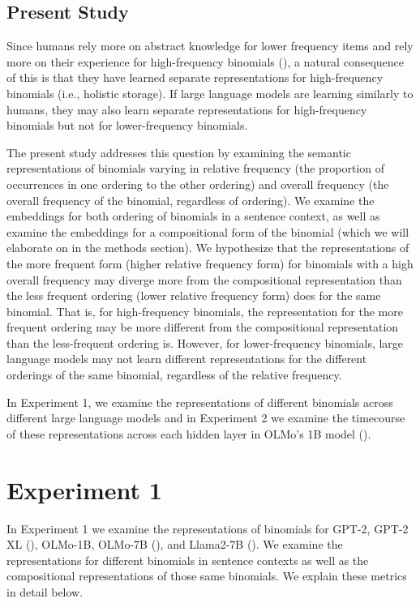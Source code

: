 \documentclass[
  12pt,
  letterpaper,
]{scrreport}
\begin{document}
\subsection{Present Study}\label{present-study-2}

Since humans rely more on abstract knowledge for lower frequency items
and rely more on their experience for high-frequency binomials
(), a natural consequence
of this is that they have learned separate representations for
high-frequency binomials (i.e., holistic storage). If large language
models are learning similarly to humans, they may also learn separate
representations for high-frequency binomials but not for lower-frequency
binomials.

The present study addresses this question by examining the semantic
representations of binomials varying in relative frequency (the
proportion of occurrences in one ordering to the other ordering) and
overall frequency (the overall frequency of the binomial, regardless of
ordering). We examine the embeddings for both ordering of binomials in a
sentence context, as well as examine the embeddings for a compositional
form of the binomial (which we will elaborate on in the methods
section). We hypothesize that the representations of the more frequent
form (higher relative frequency form) for binomials with a high overall
frequency may diverge more from the compositional representation than
the less frequent ordering (lower relative frequency form) does for the
same binomial. That is, for high-frequency binomials, the representation
for the more frequent ordering may be more different from the
compositional representation than the less-frequent ordering is.
However, for lower-frequency binomials, large language models may not
learn different representations for the different orderings of the same
binomial, regardless of the relative frequency.

In Experiment 1, we examine the representations of different binomials
across different large language models and in Experiment 2 we examine
the timecourse of these representations across each hidden layer in
OLMo's 1B model
().

\section{Experiment 1}\label{experiment-1-2}

In Experiment 1 we examine the representations of binomials for GPT-2,
GPT-2 XL (), OLMo-1B, OLMo-7B
(), and Llama2-7B (). We examine the representations for different binomials in
sentence contexts as well as the compositional representations of those
same binomials. We explain these metrics in detail below.
\end{document}
